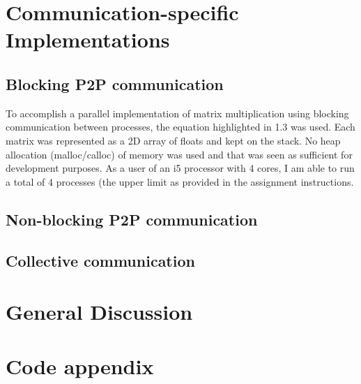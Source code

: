 \documentclass[12pt]{report}
\begin{document}
\chapter{Communication-specific Implementations}
\section{Blocking P2P communication}
To accomplish a parallel implementation of matrix multiplication using blocking communication between processes, the equation highlighted in 1.3 was used. Each matrix was represented as a 2D array of floats and kept on the stack. No heap allocation (malloc/calloc) of memory was used and that was seen as sufficient for development purposes.
As a user of an i5 processor with 4 cores, I am able to run a total of 4 processes (the upper limit as provided in the assignment instructions. 

\section{Non-blocking P2P communication}

\section{Collective communication}

\chapter{General Discussion}

\appendix
\chapter*{Code appendix}





\end{document}
